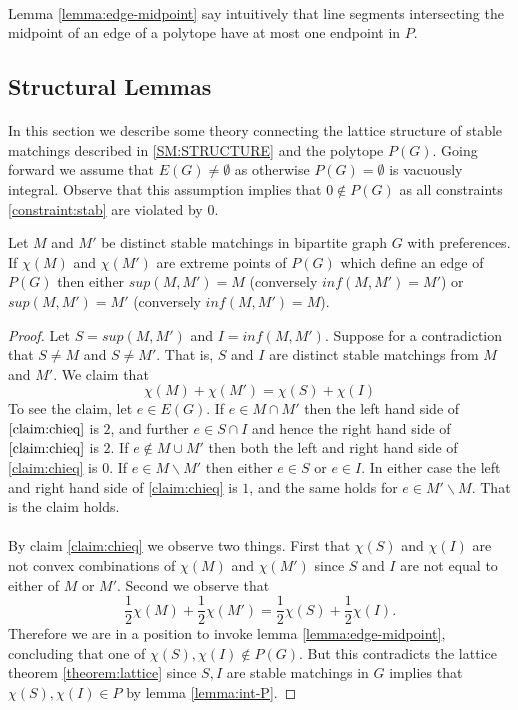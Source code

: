 \paragraph{}
Lemma \ref{lemma:edge-midpoint} say intuitively that line segments intersecting the midpoint of an edge of a polytope have at most one endpoint in $P$.
\subsection{Structural Lemmas}
\paragraph{}
In this section we describe some theory connecting the lattice structure of stable matchings described in \ref{SM:STRUCTURE} and the polytope $P(G)$. Going forward we assume that $E(G) \neq \emptyset$ as otherwise $P(G) = \emptyset$ is vacuously integral. Observe that this assumption implies that $0 \not\in P(G)$ as all constraints \ref{constraint:stab} are violated by $0$.
\begin{lemma}\label{lemma:all-same}
Let $M$ and $M'$ be distinct stable matchings in bipartite graph $G$ with preferences. If $\chi(M)$ and $\chi(M')$ are extreme points of $P(G)$ which define an edge of $P(G)$ then either $sup(M,M') = M$ (conversely $inf(M,M') = M'$) or $sup(M,M') = M'$ (conversely $inf(M,M') = M$).
\end{lemma}
\begin{proof}
Let $S = sup(M,M')$ and $I = inf(M,M')$. Suppose for a contradiction that $S \neq M$ and $S \neq M'$. That is, $S$ and $I$ are distinct stable matchings from $M$ and $M'$. We claim that
\begin{equation} \label{claim:chieq}
\chi(M) + \chi(M') = \chi(S) + \chi(I)
 \end{equation}
To see the claim, let $e \in E(G)$. If $e \in M \cap M'$ then the left hand side of $\ref{claim:chieq}$ is $2$, and further $e \in S \cap I$ and hence the right hand side of $\ref{claim:chieq}$ is $2$. If $e \not\in M \cup M'$ then both the left and right hand side of \ref{claim:chieq} is $0$. If $e \in M \backslash M'$ then either $e \in S$ or $e \in I$. In either case the left and right hand side of \ref{claim:chieq} is $1$, and the same holds for $e \in M' \backslash M$. That is the claim holds.
\paragraph{}
By claim \ref{claim:chieq} we observe two things. First that $\chi(S)$ and $\chi(I)$ are not convex combinations of $\chi(M)$ and $\chi(M')$ since $S$ and $I$ are not equal to either of $M$ or $M'$. Second we observe that $$\frac{1}{2}\chi(M) + \frac{1}{2} \chi(M') = \frac{1}{2} \chi(S) + \frac{1}{2} \chi(I).$$
Therefore we are in a position to invoke lemma \ref{lemma:edge-midpoint}, concluding that one of $\chi(S), \chi(I) \not\in P(G)$. But this contradicts the lattice theorem \ref{theorem:lattice} since $S, I$ are stable matchings in $G$ implies that $\chi(S), \chi(I) \in P$  by lemma \ref{lemma:int-P}.
\end{proof}
